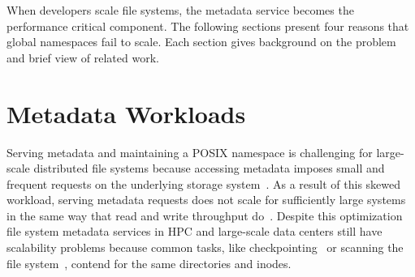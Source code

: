 
When developers scale file systems, the metadata service becomes the
performance critical component. The following sections present four reasons
that global namespaces fail to scale. Each section gives background on the
problem and brief view of related work. 

\section{Metadata Workloads}
Serving metadata and maintaining a POSIX namespace is challenging for
large-scale distributed file systems because accessing metadata imposes small
and frequent requests on the underlying storage
system~\cite{roselli:atec2000-FS-workloads}. As a result of this skewed
workload, serving metadata requests does not scale for sufficiently large
systems in the same way that read and write throughput
do~\cite{abad:ucc2012-mimesis, alam:pdsw2011-metadata-scaling,
weil:osdi2006-ceph}.  Despite this optimization file system metadata services
in HPC and large-scale data centers still have scalability problems because
common tasks, like checkpointing~\cite{bent_plfs_2009} or scanning the file
system~\cite{zheng:pdsw2014-batchfs}, contend for the same directories and
inodes.

